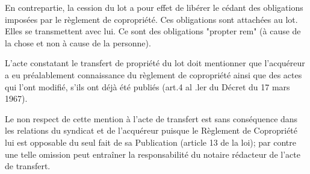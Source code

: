 			En contrepartie, la cession du lot a pour effet de libérer le cédant des obligations imposées par le règlement de copropriété. Ces obligations sont attachées au lot. Elles se transmettent avec lui. Ce sont des obligations "propter rem" (à cause de la chose et non à cause de la personne).
	
			L'acte constatant le transfert de propriété du lot doit mentionner que l'acquéreur a eu préalablement connaissance du règlement de copropriété ainsi que des actes qui l'ont modifié, s'ils ont déjà été publiés (art.4 al .ler du Décret du 17 mars 1967).
			
			Le non respect de cette mention à l'acte de transfert est sans conséquence dans les relations du syndicat et de l'acquéreur puisque le Règlement de Copropriété lui est opposable du seul fait de sa Publication (article 13 de la loi); par contre une telle omission peut entraîner la responsabilité du notaire rédacteur de l'acte de transfert.
		
